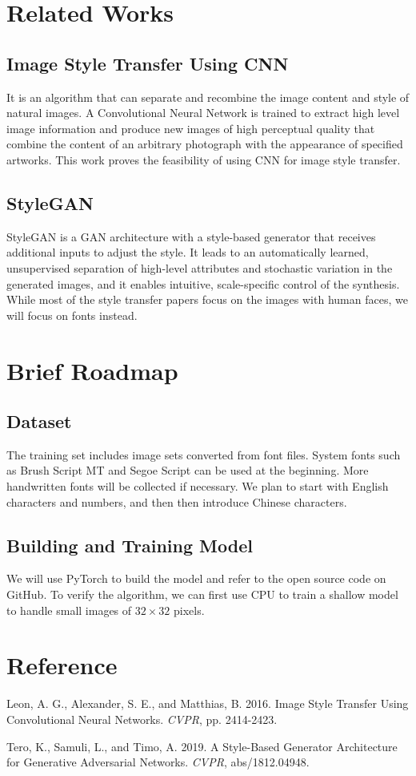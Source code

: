 \documentclass[letterpaper]{article}
\begin{document}
\section{Related Works}
\subsection{Image Style Transfer Using CNN}
It is an algorithm that can separate and recombine the image content and style of natural images. A Convolutional Neural Network is trained to extract high level image information and produce new images of high perceptual quality that combine the content of an arbitrary photograph with the appearance of specified artworks. This work proves the feasibility of using CNN for image style transfer.
\subsection{StyleGAN}
StyleGAN is a GAN architecture with a style-based generator that receives additional inputs to adjust the style. It leads to an automatically learned, unsupervised separation of high-level attributes and stochastic variation in the generated images, and it enables intuitive, scale-specific control of the synthesis.
\\
While most of the style transfer papers focus on the images with human faces, we will focus on fonts instead.

\section{Brief Roadmap}
\subsection{Dataset}
The training set includes image sets converted from font files. System fonts such as Brush Script MT and Segoe Script can be used at the beginning. More handwritten fonts will be collected if necessary. We plan to start with English characters and numbers, and then then introduce Chinese characters.
\subsection{Building and Training Model}
We will use PyTorch to build the model and refer to the open source code on GitHub. To verify the algorithm, we can first use CPU to train a shallow model to handle small images of $32 \times 32$ pixels.

\section{Reference}
\smallskip \noindent
Leon, A. G., Alexander, S. E., and Matthias, B. 2016. Image Style Transfer Using Convolutional Neural Networks. \textit{CVPR}, pp. 2414-2423.

\smallskip \noindent
Tero, K., Samuli, L., and Timo, A. 2019. A Style-Based Generator Architecture for Generative Adversarial Networks. \textit{CVPR}, abs/1812.04948.



\end{document}
